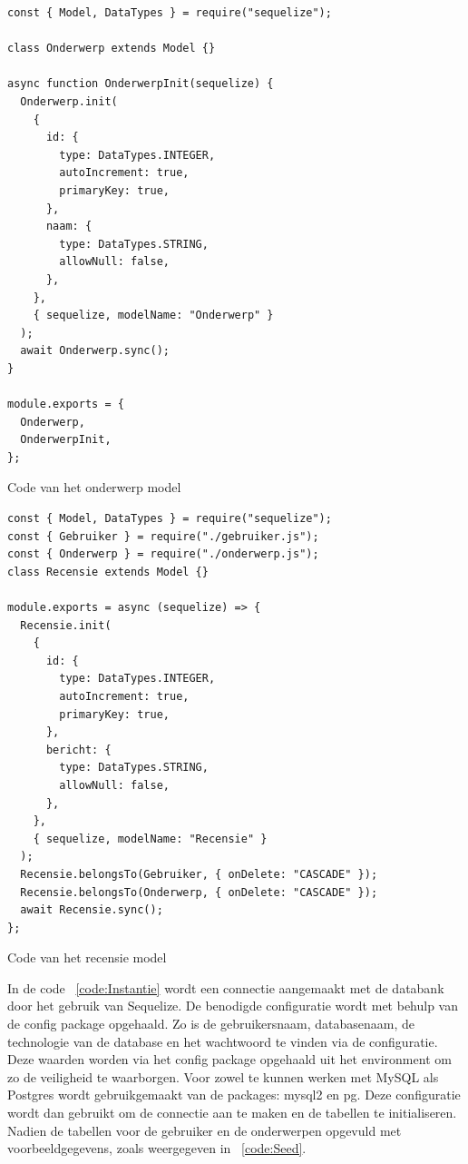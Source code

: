 \begin{listing}[H]
  \centering
  \begin{verbatim}
const { Model, DataTypes } = require("sequelize");

class Onderwerp extends Model {}

async function OnderwerpInit(sequelize) {
  Onderwerp.init(
    {
      id: {
        type: DataTypes.INTEGER,
        autoIncrement: true,
        primaryKey: true,
      },
      naam: {
        type: DataTypes.STRING,
        allowNull: false,
      },
    },
    { sequelize, modelName: "Onderwerp" }
  );
  await Onderwerp.sync();
}

module.exports = {
  Onderwerp,
  OnderwerpInit,
};
\end{verbatim}
\caption{\label{code:Subject}Code van het onderwerp model}
\end{listing}

\begin{listing}[H]
  \centering
  \begin{verbatim}
const { Model, DataTypes } = require("sequelize");
const { Gebruiker } = require("./gebruiker.js");
const { Onderwerp } = require("./onderwerp.js");
class Recensie extends Model {}

module.exports = async (sequelize) => {
  Recensie.init(
    {
      id: {
        type: DataTypes.INTEGER,
        autoIncrement: true,
        primaryKey: true,
      },
      bericht: {
        type: DataTypes.STRING,
        allowNull: false,
      },
    },
    { sequelize, modelName: "Recensie" }
  );
  Recensie.belongsTo(Gebruiker, { onDelete: "CASCADE" });
  Recensie.belongsTo(Onderwerp, { onDelete: "CASCADE" });
  await Recensie.sync();
};
\end{verbatim}
\caption{\label{code:Review}Code van het recensie model}
\end{listing}

In de code ~\ref{code:Instantie} wordt een connectie aangemaakt met de databank door het gebruik van Sequelize. 
De benodigde configuratie wordt met behulp van de config package opgehaald. Zo is de 
gebruikersnaam, databasenaam, de technologie van de database en het wachtwoord te vinden via de configuratie.
Deze waarden worden via het config package opgehaald uit het environment om zo de veiligheid te waarborgen.
Voor zowel te kunnen werken met MySQL als Postgres wordt gebruikgemaakt van de packages: mysql2 en pg.
Deze configuratie wordt dan gebruikt om de connectie aan te maken en de tabellen te initialiseren.
Nadien  de tabellen voor de gebruiker en de onderwerpen opgevuld met voorbeeldgegevens, zoals weergegeven in ~\ref{code:Seed}.

